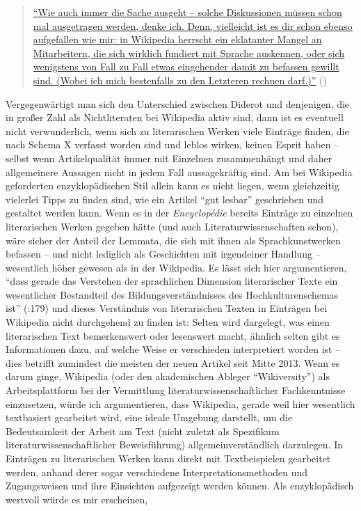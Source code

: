 \documentclass[fontsize=12pt]{scrartcl}
\begin{document}
\singlespacing
\begin{quote}
\href{https://de.wikipedia.org/w/index.php?title=Benutzer_Diskussion:Epipactis\&diff=133460313\&oldid=133455572}{"`Wie auch immer die Sache ausgeht -- solche Dis\-kus\-si\-onen m\"ussen schon mal ausgetragen werden, denke ich. Denn, vielleicht ist es dir schon ebenso aufgefallen wie mir: in Wi\-ki\-pe\-dia herrscht ein eklatanter Mangel an Mit\-ar\-bei\-tern, die sich wirklich fundiert mit Sprache auskennen, oder sich wenigstens von Fall zu Fall etwas eingehender damit zu befassen gewillt sind. (Wobei ich mich bestenfalls zu den Letzteren rechnen darf.)"'} (\cite{UserEpipactis2014})
\end{quote}
\onehalfspacing 

Vergegenw\"artigt man sich den Unterschied zwischen Diderot und denjenigen, die in gro{\ss}er Zahl als Nichtliteraten\textsuperscript{\tiny *} bei Wi\-ki\-pe\-dia aktiv sind, dann ist es eventuell nicht verwunderlich, wenn sich zu li\-te\-ra\-rischen Werken viele Eintr\"age finden, die nach Schema X verfasst worden sind und leblos wirken, keinen Esprit haben -- \mbox{selbst} wenn Artikelqualit\"at immer mit Einzelnen zusammenh\"angt und daher allgemeinere Aussagen nicht in jedem Fall aussagekr\"aftig sind. Am bei Wi\-ki\-pe\-dia geforderten enzyklop\"adischen Stil allein kann es nicht liegen, wenn gleichzeitig vie\-ler\-lei Tipps zu finden sind, wie ein Artikel "`gut lesbar"' geschrieben und gestaltet werden kann. Wenn es in der \textit{Encyclop\'{e}die} bereits Eintr\"age zu einzelnen li\-te\-ra\-rischen Werken gegeben h\"atte (und auch Li\-te\-ra\-tur\-wissenschaften schon), w\"are sicher der Anteil der Lemmata, die sich mit ihnen als Sprachkunstwerken befassen -- und nicht lediglich als Geschichten mit irgendeiner Handlung -- we\-sent\-lich h\"oher gewesen als in der Wi\-ki\-pe\-dia. Es l\"asst sich \mbox{hier} argumentieren, "`dass gerade das Verstehen der sprachlichen Dimension li\-te\-ra\-rischer Texte ein we\-sent\-licher Bestandteil des Bildungsverst\"andnisses des Hochkulturenschemas ist"' (\cite{Dawidowski2009}:179) und dieses Verst\"andnis von li\-te\-ra\-rischen Texten in Eintr\"agen bei Wi\-ki\-pe\-dia nicht durchgehend zu finden ist: Selten wird dargelegt, was einen li\-te\-ra\-rischen Text bemerkenswert oder lesenswert macht, \"ahnlich selten gibt es Informationen dazu, auf welche Weise er verschieden interpretiert worden ist -- dies betrifft zumindest die meisten der neuen Artikel seit Mitte 2013. Wenn es darum ginge, Wi\-ki\-pe\-dia (oder den akademischen Ableger "`Wikiversity"') als Arbeitsplatt\-form bei der Ver\-mitt\-lung li\-te\-ra\-tur\-wissenschaftlicher Fachkenntnisse einzusetzen, w\"urde ich argumentieren, dass Wi\-ki\-pe\-dia, gerade weil \mbox{hier} we\-sent\-lich textbasiert gearbeitet wird, eine ideale Umgebung darstellt, um die Bedeutsamkeit der Arbeit am Text (nicht zu\-letzt als Spezifikum li\-te\-ra\-tur\-wissenschaftlicher Be\-weis\-f\"uh\-rung) allgemeinverst\"andlich darzulegen. In Eintr\"agen zu li\-te\-ra\-rischen Werken kann direkt mit Textbeispielen gearbeitet werden, anhand derer sogar verschiedene In\-ter\-pre\-ta\-tions\-me\-tho\-den und Zugangsweisen und ihre Einsichten aufgezeigt werden k\"onnen. Als enzyklop\"adisch wertvoll w\"urde es mir erscheinen, 
\end{document}
